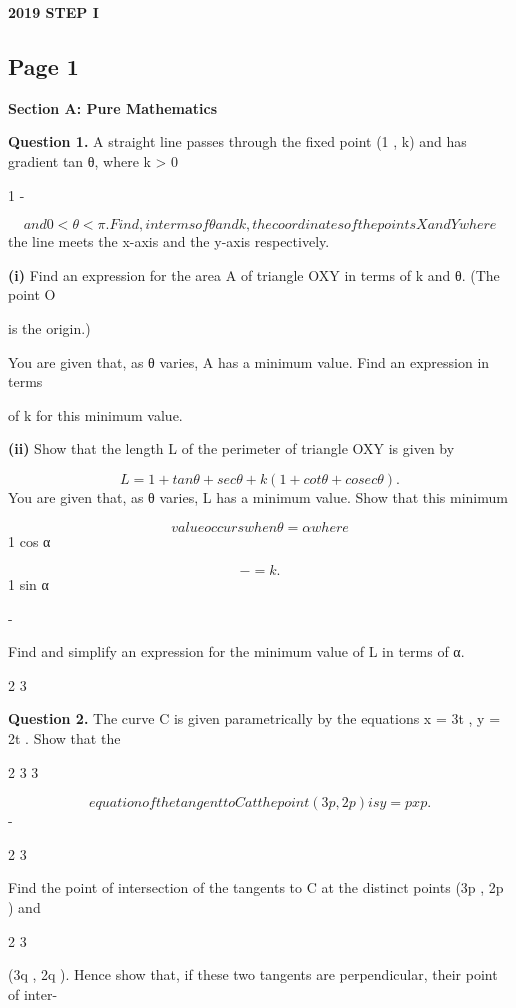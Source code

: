 \documentclass[12pt]{article}
\begin{document}
\begin{center}
{\Large \textbf{2019 STEP I}}
\end{center}

\subsection*{Page 1}
\begin{flushleft}
\bigskip\textbf{Section A: Pure Mathematics}\par
\bigskip\textbf{Question 1.} A straight line passes through the fixed point (1 , k) and has gradient tan θ, where k > 0\par
1 -\par
\[and 0 < θ < \pi. Find, in terms of θ and k, the coordinates of the points X and Y where\]
the line meets the x-axis and the y-axis respectively.\par
\textbf{(i)} Find an expression for the area A of triangle OXY in terms of k and θ. (The point O\par
is the origin.)\par
You are given that, as θ varies, A has a minimum value. Find an expression in terms\par
of k for this minimum value.\par
\textbf{(ii)} Show that the length L of the perimeter of triangle OXY is given by\par
\[L = 1 + tan θ + sec θ + k(1 + cot θ + cosec θ).\]
You are given that, as θ varies, L has a minimum value. Show that this minimum\par
\[value occurs when θ = α where\]
1 cos α\par
\[- = k.\]
1 sin α\par
-\par
Find and simplify an expression for the minimum value of L in terms of α.\par
2 3\par
\bigskip\textbf{Question 2.} The curve C is given parametrically by the equations x = 3t , y = 2t . Show that the\par
2 3 3\par
\[equation of the tangent to C at the point (3p , 2p ) is y = px p .\]
-\par
2 3\par
Find the point of intersection of the tangents to C at the distinct points (3p , 2p ) and\par
2 3\par
(3q , 2q ). Hence show that, if these two tangents are perpendicular, their point of inter-\par

\end{flushleft}
\end{document}
